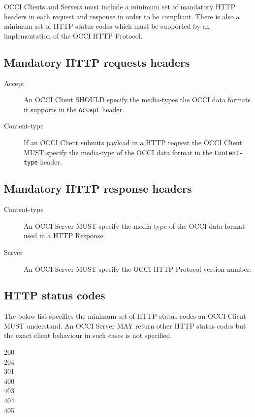 \documentclass[10pt,a4paper]{article}
\begin{document}

OCCI Clients and Servers must include a minimum set of mandatory HTTP headers
in each request and response in order to be compliant.
There is also a minimum set of HTTP status codes which must be supported by
an implementation of the OCCI HTTP Protocol.

\subsection{Mandatory HTTP requests headers}

\begin{description}
\item[Accept] An OCCI Client SHOULD specify the media-types the OCCI data
formats it supports in the {\tt Accept} header.

\item[Content-type] If an OCCI Client submits payload in a HTTP request
the OCCI Client MUST specify the media-type of the OCCI data format
in the {\tt Content-type} header.
\end{description}

\subsection{Mandatory HTTP response headers}

\begin{description}
\item[Content-type] An OCCI Server MUST specify the media-type of the OCCI data
format used in a HTTP Response.
\item[Server] An OCCI Server MUST specify the OCCI HTTP Protocol version number.
\end{description}

\subsection{HTTP status codes}

The below list specifies the minimum set of HTTP status codes an OCCI Client MUST
understand. An OCCI Server MAY return other HTTP status codes but the exact client
behaviour in such cases is not specified.

\begin{description}
\item[200]
\item[204]
\item[301]
\item[400]
\item[403]
\item[404]
\item[405]
\end{description}
\end{document}
